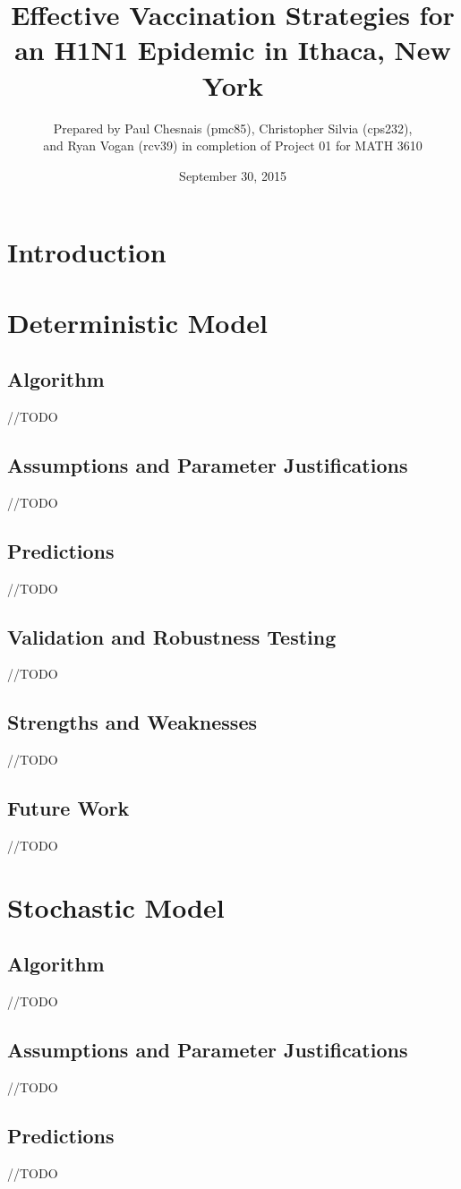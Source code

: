 \documentclass[titlepage]{article}
\title{Effective Vaccination Strategies for an H1N1 Epidemic in Ithaca, New York}
\author{Prepared by Paul Chesnais (pmc85), Christopher Silvia (cps232), \\ and Ryan Vogan (rcv39) in completion of Project 01 for MATH 3610}
\date{September 30, 2015}
\begin{document}
\maketitle

\section{Introduction}

\section{Deterministic Model}
\subsection{Algorithm}
	//TODO
\subsection{Assumptions and Parameter Justifications}
	//TODO
\subsection{Predictions}
	//TODO
\subsection{Validation and Robustness Testing}
	//TODO
\subsection{Strengths and Weaknesses}
	//TODO
\subsection{Future Work}
	//TODO

\section{Stochastic Model}
\subsection{Algorithm}
	//TODO
\subsection{Assumptions and Parameter Justifications}
	//TODO
\subsection{Predictions}
	//TODO
\end{document}
